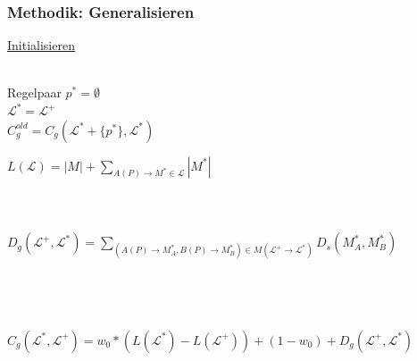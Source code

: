 \documentclass[12pt]{beamer}
\begin{document}
    \begin{frame}[allowframebreaks]
        \frametitle{Methodik: Generalisieren}

        \underline{Initialisieren}\\
        ~\\
        \begin{algorithm}[H]
            Regelpaar $p^* = \emptyset$\\
            $\mathcal{L}^* = \mathcal{L}^+$\\
            $C_g^{old} = C_g(\mathcal{L}^* + \{p^*\}, \mathcal{L}^*)$
        \end{algorithm}

        \framebreak

        \begin{algorithm}[H]
        \end{algorithm}

        \framebreak

        \begin{algorithm}[H]
            $L(\mathcal{L}) = |M| + \sum\limits_{A(P) \rightarrow M^* \in \mathcal{L}} |M^*|$
            \\~\\
            \\~\\
            $D_g(\mathcal{L}^+, \mathcal{L}^*)= \sum\limits_{(A(P) \rightarrow M^*_A , B(P) \rightarrow M^*_B) \in M(\mathcal{L^+} \rightarrow \mathcal{L^*})} D_s(M^*_A, M^*_B)$\\
            \\~\\
            \\~\\
            $C_g(\mathcal{L}^*, \mathcal{L}^+) = w_0 * (L(\mathcal{L}^*) - L(\mathcal{L}^+)) + (1 - w_0) + D_g(\mathcal{L}^+, \mathcal{L}^*)$
        \end{algorithm}
    \end{frame}
\end{document}
